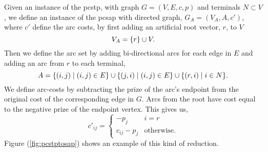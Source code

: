  Given an instance of the \gls{pcstp}, with graph $G = (V, E, c, p)$ and terminals $N \subset V$,
 we define an instance
 of the \gls{pcsap} with directed graph, $G_A = (V_A, A, c')$, where $c'$ define the arc costs,
 by first adding an
 artificial root vector, $r$, to $V$
 $$V_A = \{r\} \cup V\mathnormal{.}$$
 Then we define the arc set by adding bi-directional arcs for each edge in $E$ and
 adding an arc from $r$ to each terminal,
 $$A = \{(i,j) \mid (i,j) \in E \} \cup \{ (j,i) \mid (i,j) \in E \} \cup \{(r, i) \mid i \in N\}\mathnormal{.}$$
 We define arc-costs by subtracting the prize of the arc's endpoint from the original cost of the
 corresponding edge in $G$. Arcs from the root have cost equal to the negative prize of the endpoint vertex. This gives us,
 $$c'_{ij} =
 \begin{cases}
   -p_j & i = r \\
   c_{ij} - p_j & \text{otherwise.}
 \end{cases}
 $$
Figure (\ref{fig:pcstptosap}) shows an example of this kind of reduction.

